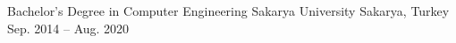 
\begin{cventries}

\cventry
{Bachelor's Degree in Computer Engineering}
{Sakarya University}
{Sakarya, Turkey}
{Sep. 2014 -- Aug. 2020}
{}

\end{cventries}
